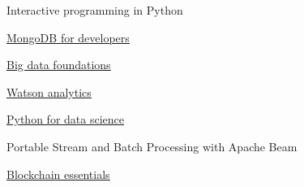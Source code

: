 %
%
%


\begin{coursework}
        {Interactive programming in Python}



        {\href{https://university.mongodb.com/course_completion/30f19185172f43e58ae4a0cd9ce13ff0}
        {\underline{MongoDB for developers}}}



        {\href{https://www.youracclaim.com/badges/fb7b0207-6a42-49fc-bf3e-48d139e150c6/public_url}
        {\underline{Big data foundations}}}

        {\href{https://www.youracclaim.com/badges/89aa54fb-143a-4053-9a97-a7b1461e1f60/public_url}
        {\underline{Watson analytics}}}


        {\href{https://courses.edx.org/certificates/0626a02340944e6b9b1854be5e171da0}
        {\underline{Python for data science}}}

        {Portable Stream and Batch Processing with Apache Beam}

        {\href{https://www.youracclaim.com/badges/a83b8a51-5619-46c7-a6a5-991e580b4951/public_url}
        {\underline{Blockchain essentials}}}


\end{coursework}
